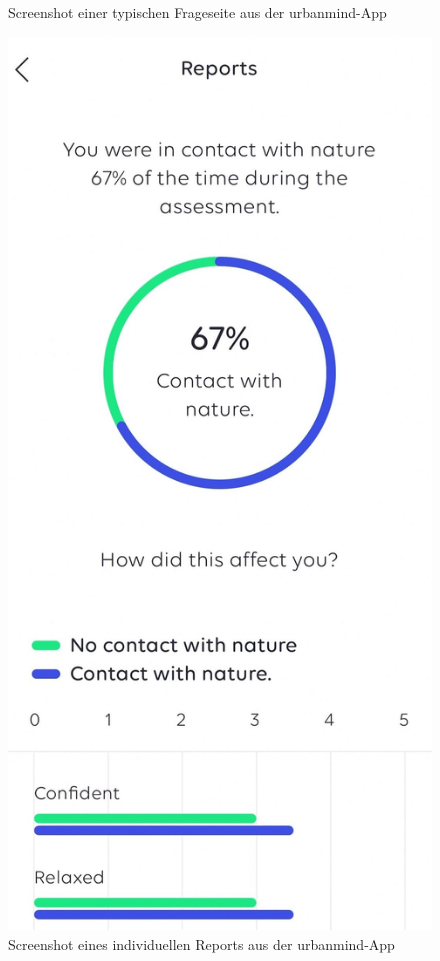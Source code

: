 \begin{figure}[h]
\begin{minipage}[t]{0.38\textwidth}
        \caption{Screenshot einer typischen Frageseite aus der \gls{urbanmind}-App}
        \label{fig:urban_mind_screenshot_1}
    \end{minipage}
    \hspace{0.1\textwidth}
    \begin{minipage}[t]{0.38\textwidth}
        \centering
        \includegraphics[width=\textwidth]{Arbeit/Bilder/urban_mind_report.jpg}
        \caption{Screenshot eines individuellen Reports aus der \gls{urbanmind}-App}
        \label{fig:urban_mind_report}
    \end{minipage}
\end{figure}

